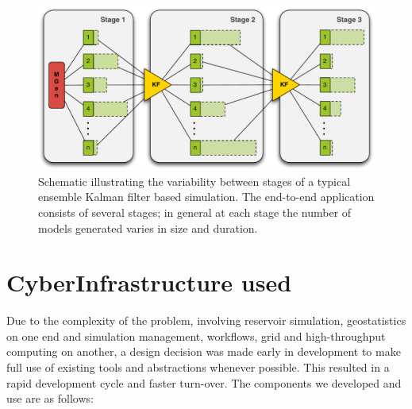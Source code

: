 \documentclass[10pt,conference,final]{IEEEtran}
\begin{document}
\begin{figure}
\begin{center}
\includegraphics*[scale=0.33,angle=0]{figures/3StageKalmanFilter}
\end{center}
\caption{Schematic illustrating the variability between stages of a typical
  ensemble Kalman filter based simulation. The end-to-end
  application consists of several stages; in general at each stage the
  number of models generated varies in size and duration.}
\label{fig:irregular_execution}
\end{figure}

\section*{CyberInfrastructure used}

Due to the complexity of the problem, involving reservoir simulation, geostatistics on one 
end and simulation management, workflows, grid and high-throughput computing on another, 
a design decision was made early in development to make full use of existing tools and 
abstractions whenever possible. This resulted in a rapid development cycle and faster 
turn-over. The components we developed and use are as follows:
\end{document}
